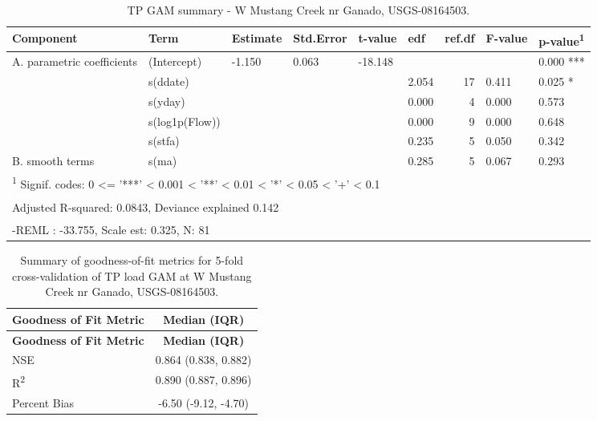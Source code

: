 \documentclass[
]{article}
\newenvironment{widestuff}{\begin{table}[h]\begin{adjustwidth}{-4.5cm}{-4.5cm}\centering}{\end{adjustwidth}\end{table}}
\begin{document}
\begin{widestuff}

\caption{TP GAM summary - W Mustang Creek nr Ganado, USGS-08164503.}
\centering
\begin{tabular}[t]{llllllrll}
\toprule
Component & Term & Estimate & Std.Error & t-value & edf & ref.df & F-value & p-value\textsuperscript{1}\\
\midrule
A. parametric coefficients & (Intercept) & -1.150 & 0.063 & -18.148 &  &  &  & 0.000 ***\\
\cmidrule{1-9}
 & s(ddate) &  &  &  & 2.054 & 17 & 0.411 & 0.025 *\\

 & s(yday) &  &  &  & 0.000 & 4 & 0.000 & 0.573\\

 & s(log1p(Flow)) &  &  &  & 0.000 & 9 & 0.000 & 0.648\\

 & s(stfa) &  &  &  & 0.235 & 5 & 0.050 & 0.342\\

\multirow[t]{-5}{*}{\raggedright\arraybackslash B. smooth terms} & s(ma) &  &  &  & 0.285 & 5 & 0.067 & 0.293\\
\bottomrule
\multicolumn{9}{l}{\textsuperscript{1} Signif. codes: 0 <= '***' < 0.001 < '**' < 0.01 < '*' < 0.05 < '+' < 0.1}\\
\multicolumn{9}{l}{\textsuperscript{} Adjusted R-squared: 0.0843, Deviance explained 0.142}\\
\multicolumn{9}{l}{\textsuperscript{} -REML : -33.755, Scale est: 0.325, N: 81}\\
\end{tabular}
\end{widestuff}

\hypertarget{tbl-TP08164503-CV}{}
\begin{longtable}[]{@{}lc@{}}
\caption{\label{tbl-TP08164503-CV}Summary of goodness-of-fit metrics for
5-fold cross-validation of TP load GAM at W Mustang Creek nr Ganado,
USGS-08164503.}\tabularnewline
\toprule()
\textbf{Goodness of Fit Metric} & \textbf{Median (IQR)} \\
\midrule()
\endfirsthead
\toprule()
\textbf{Goodness of Fit Metric} & \textbf{Median (IQR)} \\
\midrule()
\endhead
NSE & 0.864 (0.838, 0.882) \\
R\textsuperscript{2} & 0.890 (0.887, 0.896) \\
Percent Bias & -6.50 (-9.12, -4.70) \\
\bottomrule()
\end{longtable}
\end{document}
